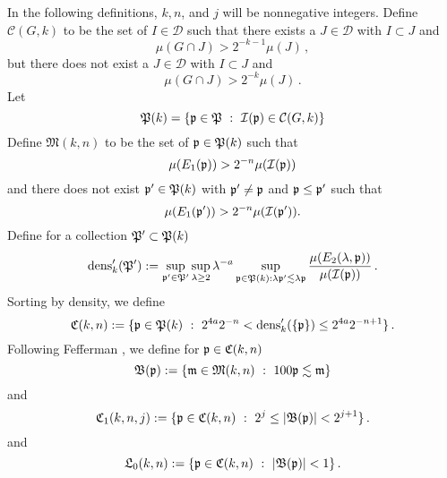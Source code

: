 {In the following definitions, $k, n$, and
$j$ will be nonnegative integers.
Define
$\mathcal{C}(G,k)$ to be the set of $I\in \mathcal{D}$
such that there exists a $J\in \mathcal{D}$ with $I\subset J$
and
\begin{equation}\label{muhj1}
   {\mu(G \cap J)} > 2^{-k-1}{\mu(J)}\, ,
\end{equation}
but there does not exist a $J\in \mathcal{D}$ with $I\subset J$ and
\begin{equation}\label{muhj2}
   {\mu(G \cap J)} > 2^{-k}{\mu(J)}\,.
\end{equation}
Let
\begin{equation}
    \label{eq-defPk}
    {\mathfrak P}(k)=\{{\mathfrak p}\in {\mathfrak P} \ : \ {\mathcal{I}}({\mathfrak p})\in \mathcal{C}(G,k)\}
\end{equation}
Define $ {\mathfrak{M}}(k,n)$ to be the set of  ${\mathfrak p} \in {\mathfrak P}(k)$ such that
 \begin{equation}\label{ebardense}
    \mu({E_1}({\mathfrak p}))  > 2^{-n}  \mu({\mathcal{I}}({\mathfrak p}))
 \end{equation}
and there does not exist ${\mathfrak p}'\in {\mathfrak P}(k)$ with
${\mathfrak p}'\neq {\mathfrak p}$ and  ${\mathfrak p}\le {\mathfrak p}'$  such that
 \begin{equation}\label{mnkmax}
    \mu({E_1}({\mathfrak p}'))  > 2^{-n}  \mu({\mathcal{I}}({\mathfrak p}')).
 \end{equation}
Define for a collection ${\mathfrak P}'\subset {\mathfrak P}(k)$
\begin{equation}
    \label{eq-densdef}
   \operatorname{\operatorname{dens}}_k' ({\mathfrak P}'):= \sup_{{\mathfrak p}'\in {\mathfrak P}'}\sup_{\lambda \geq 2} \lambda^{-a} \sup_{{\mathfrak p} \in {\mathfrak P}(k): \lambda {\mathfrak p}' \lesssim \lambda {\mathfrak p}}
    \frac{\mu({E}_2(\lambda, {\mathfrak p}))}{\mu({\mathcal{I}}({\mathfrak p}))}\,.
\end{equation}
Sorting by density, we define
\begin{equation}
    \label{def-cnk}
    {\mathfrak C}(k,n):=\{{\mathfrak p}\in {\mathfrak P}(k) \ : \
    2^{4a}2^{-n}< \operatorname{\operatorname{dens}}_k'(\{{\mathfrak p}\}) \le
    2^{4a}2^{-n+1}\}\,.
\end{equation}
Following Fefferman \cite{fefferman}, we
define for ${\mathfrak p} \in {\mathfrak C}(k,n)$
\begin{equation}\label{defbfp}
     \mathfrak{B}(\fp) := \{ \mathfrak{m} \in \mathfrak{M}(k,n) \ : \ 100 \fp \lesssim \mathfrak{m}\}
\end{equation}
and
\begin{equation}\label{defcnkj}
       {\mathfrak C}_1(k,n,j) := \{{\mathfrak p} \in {\mathfrak C}(k,n) \ : \ 2^{j} \leq |\mathfrak{B}({\mathfrak p})| < 2^{j+1}\}\,.
\end{equation}
and
\begin{equation}\label{defl0nk}
       \fL_0(k,n) := \{\fp \in \fC(k,n) \ : \ |\mathfrak{B}(\fp)| <1\}\,.

\end{equation}}
